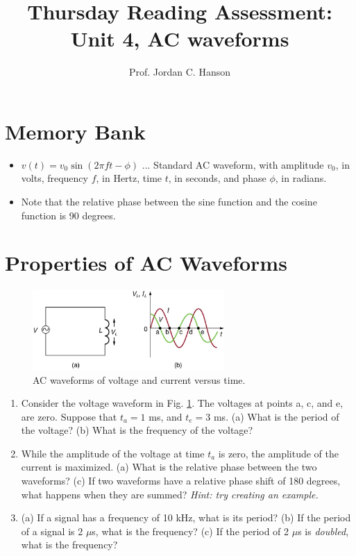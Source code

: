 \documentclass{article}
\begin{document}
\title{Thursday Reading Assessment: Unit 4, AC waveforms}
\author{Prof. Jordan C. Hanson}

\maketitle

\section{Memory Bank}

\begin{itemize}
\item $v(t) = v_0 \sin(2\pi ft - \phi)$ ... Standard AC waveform, with amplitude $v_0$, in volts, frequency $f$, in Hertz, time $t$, in seconds, and phase $\phi$, in radians.
\item Note that the relative phase between the sine function and the cosine function is 90 degrees.
\end{itemize}

\section{Properties of AC Waveforms}

\begin{figure}
\centering
\includegraphics[width=0.65\textwidth]{figures/phase.png}
\caption{\label{fig:1} AC waveforms of voltage and current versus time.}
\end{figure}

\begin{enumerate}
\item Consider the voltage waveform in Fig. \ref{fig:1}.  The voltages at points a, c, and e, are zero.  Suppose that $t_a = 1$ ms, and $t_e = 3$ ms. (a) What is the period of the voltage? (b) What is the frequency of the voltage? \\ \vspace{2cm}
\item While the amplitude of the voltage at time $t_a$ is zero, the amplitude of the current is maximized.  (a) What is the relative phase between the two waveforms? (c) If two waveforms have a relative phase shift of 180 degrees, what happens when they are summed? \textit{Hint: try creating an example.}\\ \vspace{2cm}
\item (a) If a signal has a frequency of 10 kHz, what is its period? (b) If the period of a signal is 2 $\mu$s, what is the frequency? (c) If the period of 2 $\mu$s is \textit{doubled}, what is the frequency?
\end{enumerate}
\end{document}
